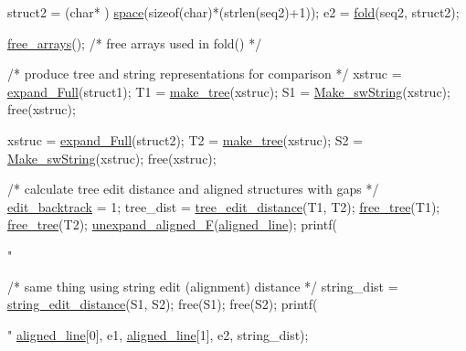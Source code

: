 \begin{DoxyCodeInclude}
   struct2 = (\textcolor{keywordtype}{char}* ) \hyperlink{utils_8h_ad7e1e137b3bf1f7108933d302a7f0177}{space}(\textcolor{keyword}{sizeof}(\textcolor{keywordtype}{char})*(strlen(seq2)+1));
   e2 =  \hyperlink{group__mfe__fold__single_gaadafcb0f140795ae62e5ca027e335a9b}{fold}(seq2, struct2);

   \hyperlink{group__mfe__fold__single_ga107fdfe5fd641868156bfd849f6866c7}{free\_arrays}();     \textcolor{comment}{/* free arrays used in fold() */}

   \textcolor{comment}{/* produce tree and string representations for comparison */}
   xstruc = \hyperlink{group__struct__utils_ga78d73cd54a068ef2812812771cdddc6f}{expand\_Full}(struct1);
   T1 = \hyperlink{treedist_8h_a08fe4d5afd385dce593b86eaf010c6e3}{make\_tree}(xstruc);
   S1 = \hyperlink{stringdist_8h_a3125991b3a403b3f89230474deb3f22e}{Make\_swString}(xstruc);
   free(xstruc);

   xstruc = \hyperlink{group__struct__utils_ga78d73cd54a068ef2812812771cdddc6f}{expand\_Full}(struct2);
   T2 = \hyperlink{treedist_8h_a08fe4d5afd385dce593b86eaf010c6e3}{make\_tree}(xstruc);
   S2 = \hyperlink{stringdist_8h_a3125991b3a403b3f89230474deb3f22e}{Make\_swString}(xstruc);
   free(xstruc);

   \textcolor{comment}{/* calculate tree edit distance and aligned structures with gaps */}
   \hyperlink{dist__vars_8h_aa03194c513af6b860e7b33e370b82bdb}{edit\_backtrack} = 1;
   tree\_dist = \hyperlink{treedist_8h_a3b21f1925f7071f46d93431a835217bb}{tree\_edit\_distance}(T1, T2);
   \hyperlink{treedist_8h_acbc1cb9bce582ea945e4a467c76a57aa}{free\_tree}(T1); \hyperlink{treedist_8h_acbc1cb9bce582ea945e4a467c76a57aa}{free\_tree}(T2);
   \hyperlink{group__struct__utils_ga1054c4477d53b31d79d4cb132100e87a}{unexpand\_aligned\_F}(\hyperlink{dist__vars_8h_ac1605fe3448ad0a0b809c4fb8f6a854a}{aligned\_line});
   printf(\textcolor{stringliteral}{"%

   \textcolor{comment}{/* same thing using string edit (alignment) distance */}
   string\_dist = \hyperlink{stringdist_8h_a89e3c335ef17780576d7c0e713830db9}{string\_edit\_distance}(S1, S2);
   free(S1); free(S2);
   printf(\textcolor{stringliteral}{"%
          \hyperlink{dist__vars_8h_ac1605fe3448ad0a0b809c4fb8f6a854a}{aligned\_line}[0], e1, \hyperlink{dist__vars_8h_ac1605fe3448ad0a0b809c4fb8f6a854a}{aligned\_line}[1], e2, string\_dist);

}}
\end{DoxyCodeInclude}

